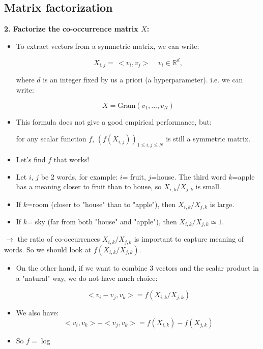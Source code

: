 \documentclass{beamer}
\begin{document}
\begin{frame}


\subsection{Matrix factorization}

\textbf{2. Factorize the co-occurrence matrix $X$:}


\begin{itemize}
\item To extract vectors from a symmetric matrix, we can write:

\[   X_{i,j} = \, <v_i,v_j>   \; \; \; \; v_i \in \mathbb{R}^d, \]
 
where $d$ is an integer fixed by us a priori (a hyperparameter). i.e. we can write:

\[   X = \mbox{Gram}(v_1,...,v_N)    \]

\item This formula does not give a good empirical performance, but:

for any scalar function $f$, $(f(X_{i,j}))_{1 \leq i,j \leq N}$ is still a symmetric matrix. 

\item Let's find $f$ that works!
\end{itemize}

\end{frame}

\begin{frame}

\begin{itemize}
\item Let $i$, $j$ be 2 words, for example: $i$= fruit, $j$=house. The third word $k$=apple has a meaning closer to fruit than to house, so $X_{i,k}/X_{j,k}$ is small.  
\item If $k$=room (closer to "house" than to "apple"), then $X_{i,k}/X_{j,k}$ is large.
\item If $k$= sky (far from both "house" and "apple"), then $X_{i,k}/X_{j,k} \simeq 1$.
\end{itemize} 

$\rightarrow$ the ratio of co-occurrences $X_{i,k}/X_{j,k}$ is important to capture meaning of words. So we should look at $f( X_{i,k}/X_{j,k})$.

\begin{itemize}
\item On the other hand, if we want to combine 3 vectors and the scalar product in a "natural" way, we do not have much choice:

\pause

\[  <v_i-v_j,v_k>=f(X_{i,k}/X_{j,k})    \]

\pause 

\item We also have:
\[  <v_i,v_k> - <v_j,v_k> = f(X_{i,k})- f(X_{j,k})    \]


\item So $  f= \log$
\end{itemize}

\end{frame}
\end{document}
